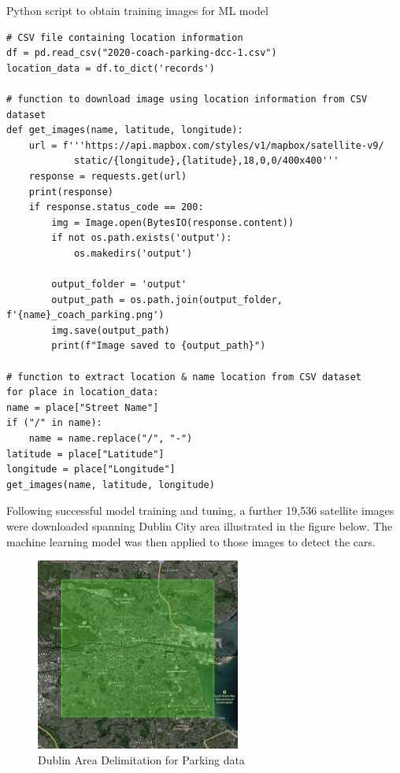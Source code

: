 \begin{listing}[htbp]
    \centering
    \caption{Python script to obtain training images for ML model}
    \begin{verbatim}
# CSV file containing location information
df = pd.read_csv("2020-coach-parking-dcc-1.csv")
location_data = df.to_dict('records')

# function to download image using location information from CSV dataset
def get_images(name, latitude, longitude):
    url = f'''https://api.mapbox.com/styles/v1/mapbox/satellite-v9/
            static/{longitude},{latitude},18,0,0/400x400'''
    response = requests.get(url)
    print(response)
    if response.status_code == 200:
        img = Image.open(BytesIO(response.content))
        if not os.path.exists('output'):
            os.makedirs('output')

        output_folder = 'output'
        output_path = os.path.join(output_folder, f'{name}_coach_parking.png')
        img.save(output_path)
        print(f"Image saved to {output_path}")

# function to extract location & name location from CSV dataset
for place in location_data:
name = place["Street Name"]
if ("/" in name):
    name = name.replace("/", "-")
latitude = place["Latitude"]
longitude = place["Longitude"]
get_images(name, latitude, longitude)
    \end{verbatim}
\end{listing}

\newpage{}

Following successful model training and tuning, a further 19,536 satellite
images were downloaded spanning Dublin City area illustrated in the figure
below. The machine learning model was then applied to those images to detect the
cars.

\begin{figure}[htbp]
    \centering
    \includegraphics[width=0.6\textwidth]{images/dublin-img-area.jpg}
    \caption{Dublin Area Delimitation for Parking data}
\end{figure}

